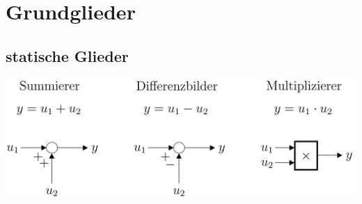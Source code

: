 

\section{Grundglieder }
	\subsection{statische Glieder }
		\includegraphics[width=10 cm]{./bilder/grundglieder/statischeGlieder.png} \\
	
